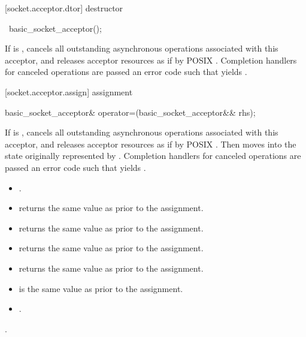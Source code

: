 [socket.acceptor.dtor]{ destructor}

\begin{itemdecl}
~basic_socket_acceptor();
\end{itemdecl}

\begin{itemdescr}
\pnum
\effects If  is , cancels all outstanding asynchronous operations associated with this acceptor, and releases acceptor resources as if by POSIX . Completion handlers for canceled operations are passed an error code  such that  yields .
\end{itemdescr}



[socket.acceptor.assign]{ assignment}

\begin{itemdecl}
basic_socket_acceptor& operator=(basic_socket_acceptor&& rhs);
\end{itemdecl}

\begin{itemdescr}
\pnum
\effects If  is , cancels all outstanding asynchronous operations associated with this acceptor, and releases acceptor resources as if by POSIX . Then moves into  the state originally represented by . Completion handlers for canceled operations are passed an error code  such that  yields .

\pnum
\postconditions 
\begin{itemize}
\item
{}.
\item
{} returns the same value as  prior to the assignment.
\item
{} returns the same value as  prior to the assignment.
\item
{} returns the same value as  prior to the assignment.
\item
{} returns the same value as  prior to the assignment.
\item
{} is the same value as  prior to the assignment.
\item
{}.
\end{itemize}

\pnum
\returns {}.
\end{itemdescr}

